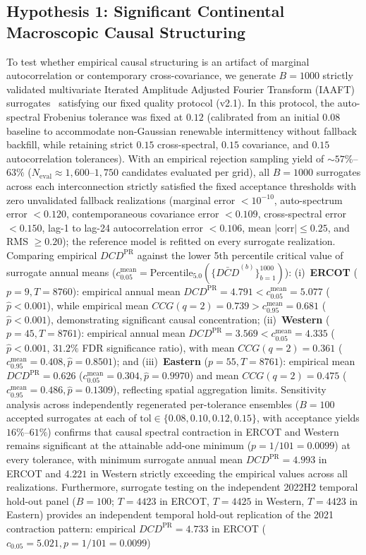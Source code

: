 \documentclass[10pt,twocolumn,journal]{article}
\begin{document}
\subsection{Hypothesis 1: Significant Continental Macroscopic Causal Structuring}
To test whether empirical causal structuring is an artifact of marginal autocorrelation or contemporary cross-covariance, we generate $B = 1000$ strictly validated multivariate Iterated Amplitude Adjusted Fourier Transform (IAAFT) surrogates~\cite{schreiber1996improved,prichard1994generating} satisfying our fixed quality protocol (v2.1). In this protocol, the auto-spectral Frobenius tolerance was fixed at $0.12$ (calibrated from an initial $0.08$ baseline to accommodate non-Gaussian renewable intermittency without fallback backfill, while retaining strict $0.15$ cross-spectral, $0.15$ covariance, and $0.15$ autocorrelation tolerances). With an empirical rejection sampling yield of $\sim 57\%$--$63\%$ ($N_{\text{eval}} \approx 1,600$--$1,750$ candidates evaluated per grid), all $B=1000$ surrogates across each interconnection strictly satisfied the fixed acceptance thresholds with zero unvalidated fallback realizations (marginal error $<10^{-10}$, auto-spectrum error $<0.120$, contemporaneous covariance error $<0.109$, cross-spectral error $<0.150$, lag-1 to lag-24 autocorrelation error $<0.106$, mean $|\text{corr}| \le 0.25$, and RMS $\ge 0.20$); the reference model is refitted on every surrogate realization. Comparing empirical $DCD^{\text{PR}}$ against the lower 5th percentile critical value of surrogate annual means ($c_{0.05}^{\text{mean}} = \text{Percentile}_{5.0}(\{\bar{DCD}^{(b)}\}_{b=1}^{1000})$): (i)~\textbf{ERCOT} ($p=9, T=8760$): empirical annual mean $DCD^{\text{PR}} = 4.791 < c_{0.05}^{\text{mean}} = 5.077$ ($\hat{p} < 0.001$), while empirical mean $CCG(q=2) = 0.739 > c_{0.95}^{\text{mean}} = 0.681$ ($\hat{p} < 0.001$), demonstrating significant causal concentration; (ii)~\textbf{Western} ($p=45, T=8761$): empirical annual mean $DCD^{\text{PR}} = 3.569 < c_{0.05}^{\text{mean}} = 4.335$ ($\hat{p} < 0.001$, $31.2\%$ FDR significance ratio), with mean $CCG(q=2) = 0.361$ ($c_{0.95}^{\text{mean}} = 0.408, \hat{p} = 0.8501$); and (iii)~\textbf{Eastern} ($p=55, T=8761$): empirical mean $DCD^{\text{PR}} = 0.626$ ($c_{0.05}^{\text{mean}} = 0.304, \hat{p} = 0.9970$) and mean $CCG(q=2) = 0.475$ ($c_{0.95}^{\text{mean}} = 0.486, \hat{p} = 0.1309$), reflecting spatial aggregation limits. Sensitivity analysis across independently regenerated per-tolerance ensembles ($B=100$ accepted surrogates at each of $\text{tol} \in \{0.08, 0.10, 0.12, 0.15\}$, with acceptance yields $16\%$--$61\%$) confirms that causal spectral contraction in ERCOT and Western remains significant at the attainable add-one minimum ($p = 1/101 = 0.0099$) at every tolerance, with minimum surrogate annual mean $DCD^{\text{PR}} = 4.993$ in ERCOT and $4.221$ in Western strictly exceeding the empirical values across all realizations. Furthermore, surrogate testing on the independent 2022H2 temporal hold-out panel ($B=100$; $T=4423$ in ERCOT, $T=4425$ in Western, $T=4423$ in Eastern) provides an independent temporal hold-out replication of the 2021 contraction pattern: empirical $DCD^{\text{PR}} = 4.733$ in ERCOT ($c_{0.05} = 5.021, p = 1/101 = 0.0099$) 
\end{document}
